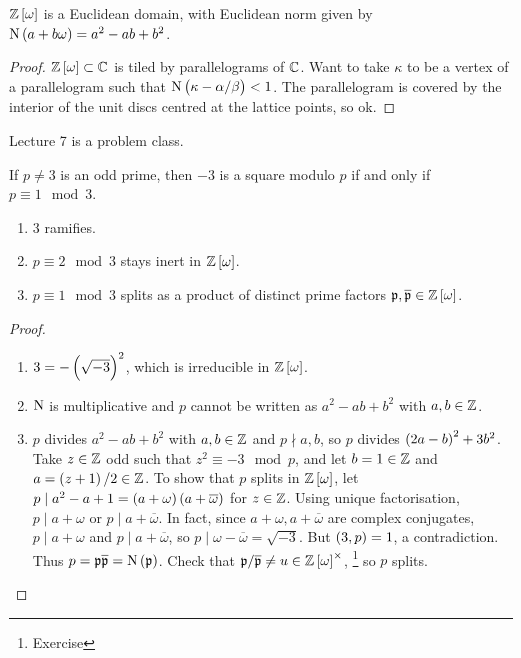 \begin{theorem}
$ \ZZ\sbr{\omega} $ is a Euclidean domain, with Euclidean norm given by $ \N\br{a + b\omega} = a^2 - ab + b^2 $.
\end{theorem}

\begin{proof}
$ \ZZ\sbr{\omega} \subset \CC $ is tiled by parallelograms of $ \mathbb{C} $. Want to take $ \kappa $ to be a vertex of a parallelogram such that $ \N\br{\kappa - \alpha / \beta} < 1 $. The parallelogram is covered by the interior of the unit discs centred at the lattice points, so ok.
\end{proof}


Lecture 7 is a problem class.


\begin{lemma}
If $ p \ne 3 $ is an odd prime, then $ -3 $ is a square modulo $ p $ if and only if $ p \equiv 1 \mod 3 $.
\end{lemma}

\pagebreak

\begin{theorem}
\hfill
\begin{enumerate}
\item $ 3 $ ramifies.
\item $ p \equiv 2 \mod 3 $ stays inert in $ \ZZ\sbr{\omega} $.
\item $ p \equiv 1 \mod 3 $ splits as a product of distinct prime factors $ \ppp, \overline{\ppp} \in \ZZ\sbr{\omega} $.
\end{enumerate}
\end{theorem}

\begin{proof}
\hfill
\begin{enumerate}
\item $ 3 = -\br{\sqrt{-3}}^2 $, which is irreducible in $ \ZZ\sbr{\omega} $.
\item $ \mathrm{N} $ is multiplicative and $ p $ cannot be written as $ a^2 - ab + b^2 $ with $ a, b \in \mathbb{Z} $.
\item $ p $ divides $ a^2 - ab + b^2 $ with $ a, b \in \mathbb{Z} $ and $ p \nmid a, b $, so $ p $ divides $ \br{2a - b}^2 + 3b^2 $. Take $ z \in \mathbb{Z} $ odd such that $ z^2 \equiv -3 \mod p $, and let $ b = 1 \in \mathbb{Z} $ and $ a = \br{z + 1} / 2 \in \ZZ $. To show that $ p $ splits in $ \ZZ\sbr{\omega} $, let $ p \mid a^2 - a + 1 = \br{a + \omega}\br{a + \overline{\omega}} $ for $ z \in \mathbb{Z} $. Using unique factorisation, $ p \mid a + \omega $ or $ p \mid a + \overline{\omega} $. In fact, since $ a + \omega, a + \overline{\omega} $ are complex conjugates, $ p \mid a + \omega $ and $ p \mid a + \overline{\omega} $, so $ p \mid \omega - \overline{\omega} = \sqrt{-3} $. But $ \br{3, p} = 1 $, a contradiction. Thus $ p = \ppp\overline{\ppp} = \N\br{\ppp} $. Check that $ \ppp / \overline{\ppp} \ne u \in \ZZ\sbr{\omega}^\times $, \footnote{Exercise} so $ p $ splits.
\end{enumerate}
\end{proof}

